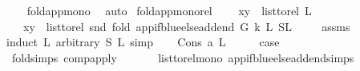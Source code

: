 \begin{isabellebody}
%
\isadelimproof
\ \ %
\endisadelimproof
%
\isatagproof
{}\isamarkupfalse%
\ fold{\isacharunderscore}{\kern0pt}app{\isacharunderscore}{\kern0pt}mono\ \isamarkupfalse%
\ auto%
\endisatagproof
{\isafoldproof}%
%
\isadelimproof
\isanewline
%
\endisadelimproof
\isanewline
\isanewline
{}\isamarkupfalse%
\ fold{\isacharunderscore}{\kern0pt}app{\isacharunderscore}{\kern0pt}mono{\isacharunderscore}{\kern0pt}rel{\isacharcolon}{\kern0pt}\ \isanewline
\ \ \ {\isachardoublequoteopen}{\isacharparenleft}{\kern0pt}x{\isacharcomma}{\kern0pt}y{\isacharparenright}{\kern0pt}\ {\isasymin}\ list{\isacharunderscore}{\kern0pt}to{\isacharunderscore}{\kern0pt}rel\ L{}{\isachardoublequoteclose}\isanewline
\ \ \ {\isachardoublequoteopen}{\isacharparenleft}{\kern0pt}x{\isacharcomma}{\kern0pt}y{\isacharparenright}{\kern0pt}\ {\isasymin}\ list{\isacharunderscore}{\kern0pt}to{\isacharunderscore}{\kern0pt}rel\ {\isacharparenleft}{\kern0pt}snd\ {\isacharparenleft}{\kern0pt}fold\ {\isacharparenleft}{\kern0pt}app{\isacharunderscore}{\kern0pt}if{\isacharunderscore}{\kern0pt}blue{\isacharunderscore}{\kern0pt}else{\isacharunderscore}{\kern0pt}add{\isacharunderscore}{\kern0pt}end\ G\ k{\isacharparenright}{\kern0pt}\ L{}\ {\isacharparenleft}{\kern0pt}S{\isacharcomma}{\kern0pt}L{}{\isacharparenright}{\kern0pt}{\isacharparenright}{\kern0pt}{\isacharparenright}{\kern0pt}{\isachardoublequoteclose}\ \isanewline
%
\isadelimproof
\ \ %
\endisadelimproof
%
\isatagproof
{}\isamarkupfalse%
\ assms\ \isanewline
{}\isamarkupfalse%
{\isacharparenleft}{\kern0pt}induct\ L{}\ arbitrary{\isacharcolon}{\kern0pt}\ S\ L{}{\isacharcomma}{\kern0pt}\ simp{\isacharparenright}{\kern0pt}\isanewline
\ \ \isamarkupfalse%
\ {\isacharparenleft}{\kern0pt}Cons\ a\ L{}{\isacharparenright}{\kern0pt}\isanewline
\ \ \isamarkupfalse%
\ \isamarkupfalse%
\ {\isacharquery}{\kern0pt}case\ \isanewline
\ \ \ \ \isamarkupfalse%
\ fold{\isachardot}{\kern0pt}simps{\isacharparenleft}{\kern0pt}{}{\isacharparenright}{\kern0pt}\ comp{\isacharunderscore}{\kern0pt}apply\ \isanewline
\ \ \ \ \isamarkupfalse%
\ list{\isacharunderscore}{\kern0pt}to{\isacharunderscore}{\kern0pt}rel{\isacharunderscore}{\kern0pt}mono\ app{\isacharunderscore}{\kern0pt}if{\isacharunderscore}{\kern0pt}blue{\isacharunderscore}{\kern0pt}else{\isacharunderscore}{\kern0pt}add{\isacharunderscore}{\kern0pt}end{\isachardot}{\kern0pt}simps\isanewline

\end{isabellebody}
